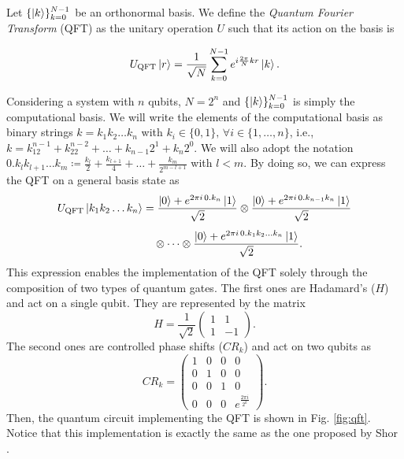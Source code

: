 \documentclass[aps,prl,twocolumn,superscriptaddress,groupedaddress]{revtex4}  %
\begin{document}
Let $\{\ket{k}\}_{k=0}^{N-1}$ be an orthonormal basis. We define the \textit{Quantum Fourier Transform} (QFT) as the unitary operation $U$ such that its action on the basis is 

\[U_{\text{QFT}}\ket{r}=\frac{1}{\sqrt{N}}\sum_{k=0}^{N-1}e^{i\frac{2\pi}{N}kr}\ket{k}.\]

Considering a system with $n$ qubits, $N=2^n$ and $\{\ket{k}\}_{k=0}^{N-1}$ is simply the computational basis. We will write the elements of the computational basis as binary strings $k=k_1k_2\dots k_n$ with $k_i\in\{0,1\},\, \forall i\in\{1,\dots,n\}$, i.e., $k=k_12^{n-1}+k_22^{n-2}+\dots+k_{n-1}2^1+k_n2^0$. We will also adopt the notation $0.k_lk_{l+1}\dots k_m\coloneqq \frac{k_l}{2}+ \frac{k_{l+1}}{4}+\dots+\frac{k_{m}}{2^{m-l+1}}$ with $l<m$. By doing so, we can express the QFT on a general basis state as
{\small
\begin{equation}\label{eq: QFT output}
    \begin{split}
        U_{\mathrm{QFT}}\ket{k_1 k_2 \dots k_n}
&= \frac{\ket{0} + e^{2\pi i\, 0.k_n}\ket{1}}{\sqrt{2}}
   \otimes \frac{\ket{0} + e^{2\pi i\, 0.k_{n-1}k_n}\ket{1}}{\sqrt{2}} \\[4pt]
&\quad \otimes \cdots \otimes
   \frac{\ket{0} + e^{2\pi i\, 0.k_1k_2\dots k_n}\ket{1}}{\sqrt{2}}.
    \end{split}
\end{equation}
}
This expression enables the implementation of the QFT solely through the composition of two types of quantum gates. The first ones are Hadamard's ($H$) and act on a single qubit. They are represented by the matrix \[H=\frac{1}{\sqrt{2}}\begin{pmatrix}
    1&1\\1&-1
\end{pmatrix}.\]
The second ones are controlled phase shifts ($CR_k$) and act on two qubits as \[CR_k=\begin{pmatrix} 1&0&0&0\\0&1&0&0\\ 0&0&1&0 \\ 0&0&0&e^{\frac{2\pi i}{2^k}} \end{pmatrix}.\]
Then, the quantum circuit implementing the QFT is shown in Fig. \ref{fig:qft}. Notice that this implementation is exactly the same as the one proposed by Shor \cite{Shor_1994}.
\end{document}
